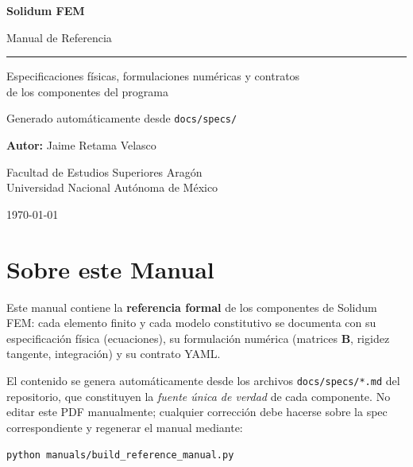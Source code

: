 \documentclass[11pt,letterpaper,oneside]{report}
\begin{document}
\begin{titlepage}
    \centering
    \vspace*{2cm}
    {\Huge\bfseries\color{yamlkey} Solidum FEM \par}
    \vspace{1cm}
    {\LARGE Manual de Referencia \par}
    \vspace{0.5cm}
    \rule{\linewidth}{0.5mm} \par
    \vspace{2cm}
    {\large Especificaciones físicas, formulaciones numéricas y contratos\\
            de los componentes del programa\par}
    \vspace{2cm}
    {\large Generado automáticamente desde \texttt{docs/specs/}\par}
    \vspace{1cm}
    {\Large \textbf{Autor:} Jaime Retama Velasco \par}
    \vspace{0.5cm}
    {\large Facultad de Estudios Superiores Aragón \\ Universidad Nacional Autónoma de México \par}
    \vfill
    {\large \today \par}
\end{titlepage}

\setcounter{page}{1}
\tableofcontents
\newpage

\chapter*{Sobre este Manual}
\noindent Este manual contiene la \textbf{referencia formal} de los componentes de Solidum FEM: cada elemento finito y cada modelo constitutivo se documenta con su especificación física (ecuaciones), su formulación numérica (matrices $\mathbf B$, rigidez tangente, integración) y su contrato YAML.

El contenido se genera automáticamente desde los archivos \texttt{docs/specs/*.md} del repositorio, que constituyen la \emph{fuente única de verdad} de cada componente. No editar este PDF manualmente; cualquier corrección debe hacerse sobre la spec correspondiente y regenerar el manual mediante:
\begin{center}\texttt{python manuals/build\_reference\_manual.py}\end{center}
\end{document}
